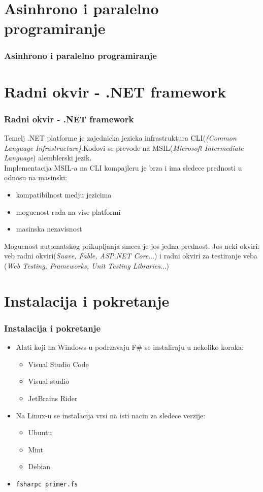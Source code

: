 \documentclass{beamer}
\begin{document}
\section{Asinhrono i paralelno programiranje}
\begin{frame}[fragile]
\frametitle{Asinhrono i paralelno programiranje}



\end{frame}

\section{Radni okvir - .NET framework}
\begin{frame}[fragile]
\frametitle{Radni okvir - .NET framework}
Temelj .NET platforme je zajednicka jezicka infrastruktura CLI({\em(Common Language Infrastructure)}.Kodovi se prevode na MSIL({\em Microsoft Intermediate Language}) alemblerski jezik.\\
Implementacija MSIL-a na CLI kompajleru je brza i ima sledece prednosti u odnosu na masinski:
\begin{itemize}
	\item kompatibilnost medju jezicima
	\item mogucnost rada na vise platformi
	\item masinska nezavisnost
\end{itemize}
Mogucnost automatskog prikupljanja smeca je jos jedna prednost.
Jos neki okviri: veb radni okviri({\em Suave, Fable, ASP.NET Core}...) i radni okviri za testiranje veba ({\em Web Testing, Frameworks, Unit Testing Libraries}...)
\end{frame}

\section{Instalacija i pokretanje}
\begin{frame}[fragile]
\frametitle{Instalacija i pokretanje}

\begin{itemize}
\item Alati koji na Windows-u podrzavaju F\# se instaliraju u nekoliko koraka:
	\begin{itemize}
	\item Visual Studio Code
	\item Visual studio
	\item JetBrains Rider
	\end{itemize}
\item Na Linux-u se instalacija vrsi na isti nacin za sledece verzije:
	\begin{itemize}
	\item Ubuntu
	\item Mint
	\item Debian
	\end{itemize}
	\item \begin{lstlisting}
fsharpc primer.fs
\end{lstlisting}
\end{itemize}
\end{frame}
\end{document}
